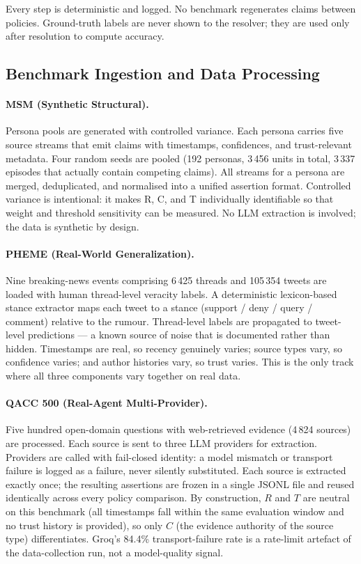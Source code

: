 \documentclass[12pt,a4paper]{article}
\begin{document}
Every step is deterministic and logged. No benchmark regenerates claims between policies. Ground-truth labels are never shown to the resolver; they are used only after resolution to compute accuracy.

\subsection{Benchmark Ingestion and Data Processing}

\paragraph{MSM (Synthetic Structural).} Persona pools are generated with controlled variance. Each persona carries five source streams that emit claims with timestamps, confidences, and trust-relevant metadata. Four random seeds are pooled (192 personas, 3\,456 units in total, 3\,337 episodes that actually contain competing claims). All streams for a persona are merged, deduplicated, and normalised into a unified assertion format. Controlled variance is intentional: it makes R, C, and T individually identifiable so that weight and threshold sensitivity can be measured. No LLM extraction is involved; the data is synthetic by design.

\paragraph{PHEME (Real-World Generalization).} Nine breaking-news events comprising 6\,425 threads and 105\,354 tweets are loaded with human thread-level veracity labels. A deterministic lexicon-based stance extractor maps each tweet to a stance (support / deny / query / comment) relative to the rumour. Thread-level labels are propagated to tweet-level predictions --- a known source of noise that is documented rather than hidden. Timestamps are real, so recency genuinely varies; source types vary, so confidence varies; and author histories vary, so trust varies. This is the only track where all three components vary together on real data.

\paragraph{QACC 500 (Real-Agent Multi-Provider).} Five hundred open-domain questions with web-retrieved evidence (4\,824 sources) are processed. Each source is sent to three LLM providers for extraction. Providers are called with fail-closed identity: a model mismatch or transport failure is logged as a failure, never silently substituted. Each source is extracted exactly once; the resulting assertions are frozen in a single JSONL file and reused identically across every policy comparison. By construction, $R$ and $T$ are neutral on this benchmark (all timestamps fall within the same evaluation window and no trust history is provided), so only $C$ (the evidence authority of the source type) differentiates. Groq's 84.4\% transport-failure rate is a rate-limit artefact of the data-collection run, not a model-quality signal.
\end{document}
